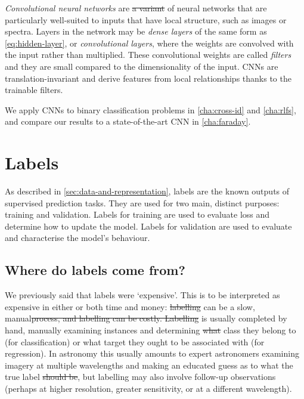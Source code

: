 \documentclass[11pt, a4paper]{book}
\newcommand{\defn}[1]{\emph{#1}}
\providecommand{\DIFaddtex}[1]{{\protect\color{blue}\uwave{#1}}} %
\providecommand{\DIFdeltex}[1]{{\protect\color{red}\sout{#1}}}                      %
\providecommand{\DIFaddbegin}{} %
\providecommand{\DIFaddend}{} %
\providecommand{\DIFdelbegin}{} %
\providecommand{\DIFdelend}{} %
\providecommand{\DIFadd}[1]{\texorpdfstring{\DIFaddtex{#1}}{#1}} %
\providecommand{\DIFdel}[1]{\texorpdfstring{\DIFdeltex{#1}}{}} %
\newcommand{\DIFscaledelfig}{0.5}
\newlength{\DIFdelgraphicswidth} %
\newlength{\DIFdelgraphicsheight} %
\newcommand{\DIFaddincludegraphics}[2][]{{\color{blue}\fbox{\DIFOincludegraphics[#1]{#2}}}} %
\newcommand{\DIFdelincludegraphics}[2][]{%
\sbox{\DIFdelgraphicsbox}{\DIFOincludegraphics[#1]{#2}}%
\settoboxwidth{\DIFdelgraphicswidth}{\DIFdelgraphicsbox} %
\settoboxtotalheight{\DIFdelgraphicsheight}{\DIFdelgraphicsbox} %
\scalebox{\DIFscaledelfig}{%
\parbox[b]{\DIFdelgraphicswidth}{\usebox{\DIFdelgraphicsbox}\\[-\baselineskip] \rule{\DIFdelgraphicswidth}{0em}}\llap{\resizebox{\DIFdelgraphicswidth}{\DIFdelgraphicsheight}{%
\setlength{\unitlength}{\DIFdelgraphicswidth}%
\begin{picture}(1,1)%
\thicklines\linethickness{2pt} %
{\color[rgb]{1,0,0}\put(0,0){\framebox(1,1){}}}%
{\color[rgb]{1,0,0}\put(0,0){\line( 1,1){1}}}%
{\color[rgb]{1,0,0}\put(0,1){\line(1,-1){1}}}%
\end{picture}%
}\hspace*{3pt}}} %
} %
\DeclareRobustCommand{\DIFaddbegin}{\DIFOaddbegin \let\includegraphics\DIFaddincludegraphics} %
\DeclareRobustCommand{\DIFaddend}{\DIFOaddend \let\includegraphics\DIFOincludegraphics} %
\DeclareRobustCommand{\DIFdelbegin}{\DIFOdelbegin \let\includegraphics\DIFdelincludegraphics} %
\DeclareRobustCommand{\DIFdelend}{\DIFOaddend \let\includegraphics\DIFOincludegraphics} %
\begin{document}
        \defn{Convolutional neural networks} \citep[CNN;][]{lecun98} are \DIFdelbegin \DIFdel{a variant }\DIFdelend \DIFaddbegin \DIFadd{variants }\DIFaddend of neural networks that are particularly well-suited to inputs that have local structure, such as images or spectra. Layers in the network may be \defn{dense layers} of the same form as \autoref{eq:hidden-layer}, or \defn{convolutional layers}, where the weights are convolved with the input rather than multiplied. These convolutional weights are called \defn{filters} and they are small compared to the dimensionality of the input. CNNs are translation-invariant \citep{waibel_phoneme_1989} and derive features from local relationships thanks to the trainable filters.

        We apply CNNs to binary classification problems in \autoref{cha:cross-id} and \autoref{cha:rlfs}, and compare our results to a state-of-the-art CNN in \autoref{cha:faraday}.

\section{Labels}
\label{sec:labels}

    As described in \autoref{sec:data-and-representation}, labels are the known outputs of supervised prediction tasks. They are used for two main, distinct purposes: training and validation. Labels for training are used to evaluate loss and determine how to update the model. Labels for validation are used to evaluate and characterise the model's behaviour.

    \subsection{Where do labels come from?}
    \label{sec:sources-of-labels}

        We previously said that labels were `expensive'. This is to be interpreted as expensive in either or both time and money: \DIFdelbegin \DIFdel{labelling }\DIFdelend \DIFaddbegin \DIFadd{Labelling }\DIFaddend can be a slow, manual\DIFdelbegin \DIFdel{process, and labelling can be costly. Labelling }\DIFdelend \DIFaddbegin \DIFadd{, and process. It }\DIFaddend is usually completed by hand, manually examining instances and determining \DIFdelbegin \DIFdel{what }\DIFdelend \DIFaddbegin \DIFadd{which }\DIFaddend class they belong to (for classification) or what target they ought to be associated with (for regression). In astronomy this usually amounts to expert astronomers examining imagery at multiple wavelengths and making an educated guess as to what the true label \DIFdelbegin \DIFdel{should be}\DIFdelend \DIFaddbegin \DIFadd{is}\DIFaddend , but labelling may also involve follow-up observations (perhaps at higher resolution, greater sensitivity, or at a different wavelength).
\end{document}
